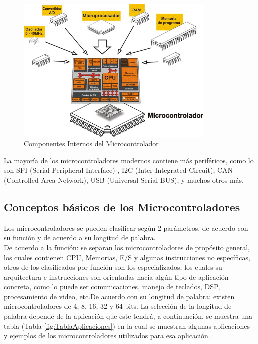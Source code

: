 \documentclass[12pt,a4paper]{article}
\begin{document}
   \begin{figure}[htpb]
   \centering
   \includegraphics[height=7cm]{Figura1_1}
   \caption{Componentes Internos del Microcontrolador \cite{Ravi}}
   \label{fig:ComponentesMicrocontrolador}
   \end{figure}
   
   La mayoría de los microcontroladores modernos contiene más periféricos, como lo son SPI (Serial Peripheral Interface) , I2C (Inter Integrated Circuit), CAN (Controlled Area Network), USB (Universal Serial BUS), y muchos otros más. 
   
   \subsection{Conceptos básicos de los Microcontroladores}
   Los microcontroladores se pueden clasificar según 2 parámetros, de acuerdo con su función y de acuerdo a su longitud de palabra.\\
   De acuerdo a la función: se separan los microcontroladores de propósito general, los cuales contienen CPU, Memorias, E/S y algunas instrucciones no específicas, otros de los clasificados por función son los especializados, los cuales su arquitectura e instrucciones son orientadas hacia algún tipo de aplicación concreta, como lo puede ser comunicaciones, manejo de teclados, DSP, procesamiento de video, etc.De acuerdo con su longitud de palabra: existen microcontroladores de 4, 8, 16, 32 y 64 bits. La selección de la longitud de palabra depende de la aplicación que este tendrá, a continuación, se muestra una tabla (Tabla \ref{fig:TablaAplicaciones}) en la cual se muestran algunas aplicaciones y ejemplos de los microcontroladores utilizados para esa aplicación.
   
\end{document}
